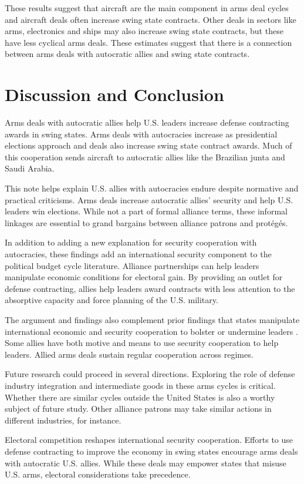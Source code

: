 \documentclass[12pt]{article}
\begin{document}
These results suggest that aircraft are the main component in arms deal cycles and aircraft deals often increase swing state contracts. 
Other deals in sectors like arms, electronics and ships may also increase swing state contracts, but these have less cyclical arms deals. 
These estimates suggest that there is a connection between arms deals with autocratic allies and swing state contracts.  



\section{Discussion and Conclusion}


Arms deals with autocratic allies help U.S. leaders increase defense contracting awards in swing states. 
Arms deals with autocracies increase as presidential elections approach and deals also increase swing state contract awards. 
Much of this cooperation sends aircraft to autocratic allies like the Brazilian junta and Saudi Arabia.


This note helps explain U.S. allies with autocracies endure despite normative and practical criticisms. 
Arms deals increase autocratic allies' security and help U.S. leaders win elections.
While not a part of formal alliance terms, these informal linkages are essential to grand bargains between alliance patrons and prot{\'e}g{\'e}s.


In addition to adding a new explanation for security cooperation with autocracies, these findings add an international security component to the political budget cycle literature.
Alliance partnerships can help leaders manipulate economic conditions for electoral gain. 
By providing an outlet for defense contracting, allies help leaders award contracts with less attention to the absorptive capacity and force planning of the U.S. military.


The argument and findings also complement prior findings that states manipulate international economic and security cooperation to bolster or undermine leaders \citep{ChyzhUrbatsch2021, KimMargalit2021}. 
Some allies have both motive and means to use security cooperation to help leaders. 
Allied arms deals sustain regular cooperation across regimes.


Future research could proceed in several directions. 
Exploring the role of defense industry integration and intermediate goods in these arms cycles is critical.
Whether there are similar cycles outside the United States is also a worthy subject of future study. 
Other alliance patrons may take similar actions in different industries, for instance.


Electoral competition reshapes international security cooperation.
Efforts to use defense contracting to improve the economy in swing states encourage arms deals with autocratic U.S. allies.
While these deals may empower states that misuse U.S. arms, electoral considerations take precedence. 


\newpage
\singlespace
 
 
\end{document}
